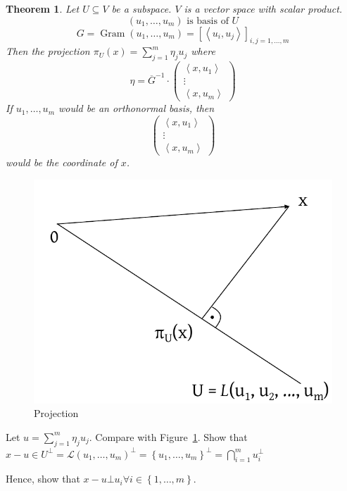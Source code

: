 \documentclass{article}
\newtheorem{theorem}{Theorem}  \numberwithin{theorem}{section}
\newcommand{\set}[1]{\left\{#1\right\}}
\newcommand{\ip}[2]{\left\langle#1,#2\right\rangle} %
\begin{document}
\begin{theorem} %
  Let $U \subseteq V$ be a subspace. $V$ is a vector space with scalar product.
  \[ (u_1, \ldots, u_m) \text{ is basis of } U \]
  \[ G = \operatorname{Gram}(u_1, \ldots, u_m) = \left[\ip{u_i}{u_j}\right]_{i,j=1,\ldots,m} \]
  Then the projection $\pi_U(x) = \sum_{j=1}^m \eta_j u_j$ where
  \[ \eta = \overline{G}^{-1} \cdot \begin{pmatrix} \ip{x}{u_1} \\ \vdots \\ \ip{x}{u_m} \end{pmatrix} \]
  If $u_1, \ldots, u_m$ would be an orthonormal basis, then
  \[ \begin{pmatrix} \ip{x}{u_1} \\ \vdots \\ \ip{x}{u_m} \end{pmatrix} \]
  would be the coordinate of $x$.
\end{theorem}

\begin{figure}[t]
  \begin{center}
    \includegraphics{img/11_projection.pdf}
    \caption{Projection}
    \label{img:projection}
  \end{center}
\end{figure}

Let $u = \sum_{j=1}^m \eta_j u_j$. Compare with Figure~\ref{img:projection}.
Show that $x - u \in U^{\bot} = \mathcal L(u_1, \ldots, u_m)^\bot = \set{u_1, \ldots, u_m}^\bot = \bigcap_{i=1}^m u_i^\bot$

Hence, show that $x - u \bot u_i \forall i \in \set{1, \ldots, m}$.
\end{document}
